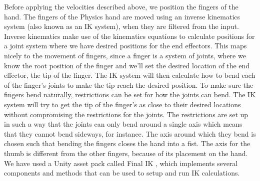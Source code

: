 Before applying the velocities described above, we position the fingers of the hand. The fingers of the Physics hand are moved using an inverse kinematics system (also known as an IK system), when they are filtered from the input. Inverse kinematics make use of the kinematics equations to calculate positions for a joint system where we have desired positions for the end effectors. This maps nicely to the movement of fingers, since a finger is a system of joints, where we know the root position of the finger and we'll set the desired location of the end effector, the tip of the finger. The IK system will then calculate how to bend each of the finger's joints to make the tip reach the desired position. To make sure the fingers bend naturally, restrictions can be set for how the joints can bend. The IK system will try to get the tip of the finger's as close to their desired locations without compromising the restrictions for the joints. The restrictions are set up in such a way that the joints can only bend around a single axis which means that they cannot bend sideways, for instance. The axis around which they bend is chosen such that bending the fingers closes the hand into a fist. The axis for the thumb is different from the other fingers, because of its placement on the hand. We have used a Unity asset pack called Final IK \parencite{RootMotion2017}, which implements several components and methods that can be used to setup and run IK calculations.

